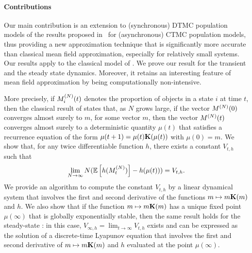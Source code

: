 \documentclass{amsart}
\begin{document}
\paragraph*{Contributions}
Our main contribution is an extension to (synchronous) DTMC population models of the results 
proposed in~\cite{gast2017refined} for (asynchronous) CTMC population models, thus providing a new approximation technique that is significantly more accurate than classical mean field approximation, especially for relatively small systems.
Our results apply to the classical model of
\cite{Le+07,gastgaujalDEDS,latella2013fly}. We prove our result for
the transient and the steady state dynamics. Moreover, it retains an
interesting feature of mean field approximation by being
computationally non-intensive.

More precisely, if $M^{(N)}_i(t)$ denotes the proportion of objects in a
state $i$ at time $t$, then the classical result of \cite{Le+07}
states that, as $N$ grows large, if the vector $M^{(N)}(0)$ converges almost surely
to $m$, for some vector $m$, then the vector $M^{(N)}(t)$ converges almost
surely to a deterministic quantity $\mu(t)$ that satisfies a
recurrence equation of the form $\mu(t+1)=\mu(t)\mathbf{K}(\mu(t))$ with
$\mu(0)=m$. We show that, for any twice differentiable function $h$, there
exists a constant $V_{t,h}$ such that
\begin{align}
  \label{eq:main_result}
  \lim_{N\to\infty} N(\esp{h(\MN_t)} - h(\mu(t))) = V_{t,h}.
\end{align}
We provide an algorithm to compute the constant $V_{t,h}$ by a linear
dynamical system that involves the first and second derivative of the
functions $m\mapsto m\mathbf{K}(m)$ and $h$.  We also show that if the function
$m\mapsto m\mathbf{K}(m)$ has a unique fixed point $\mu(\infty)$ that is
globally exponentially stable, then the same result holds for the
steady-state : in this case, $V_{\infty,h}=\lim_{t\to\infty}V_{t,h}$
exists and can be expressed as the solution of a discrete-time
Lyapunov equation that involves the first and second derivative of
$m\mapsto m\mathbf{K}(m)$ and $h$ evaluated at the point $\mu(\infty)$.
\end{document}
